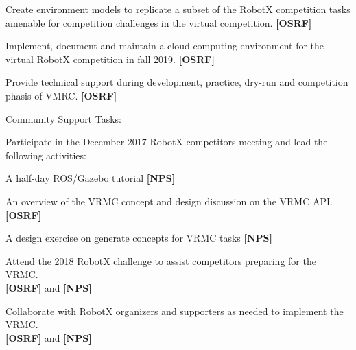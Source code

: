 \documentclass[11pt]{article}
\begin{document}
\begin{sow}
\begin{sow}
  \item Create environment models to replicate a subset of the RobotX competition tasks amenable for competition challenges in the virtual competition. {\bf[OSRF]}
  \item Implement, document and maintain a cloud computing environment for the virtual RobotX competition in fall 2019. {\bf[OSRF]}
  \item Provide technical support during development, practice, dry-run and competition phasis of VMRC. {\bf[OSRF]}
  \end{sow}
  \item Community Support Tasks:
  \begin{sow}
    \item Participate in the December 2017 RobotX competitors meeting and lead the following activities:
      \begin{sow}
        \item A half-day ROS/Gazebo tutorial {\bf[NPS]}
        \item An overview of the VRMC concept and design discussion on the VRMC API. {\bf[OSRF]}
        \item A design exercise on generate concepts for VRMC tasks {\bf[NPS]}
        \end{sow}
      \item Attend the 2018 RobotX challenge to assist competitors preparing for the VRMC. \\ {\bf[OSRF]} and {\bf[NPS]}
      \item Collaborate with RobotX organizers and supporters as needed to implement the VRMC. \\ {\bf[OSRF]} and {\bf[NPS]}
  \end{sow}
\end{sow}
\end{document}
